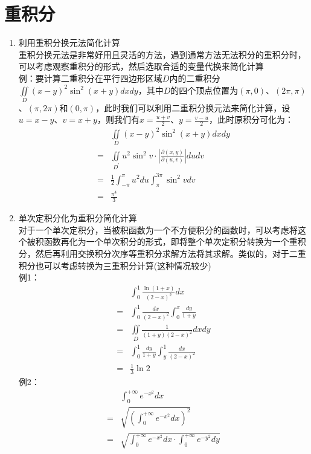 \documentclass[12pt,a4paper,UTF8]{book}
\begin{document}
\section{重积分}
\begin{enumerate}
\item 利用重积分换元法简化计算\\
重积分换元法是非常好用且灵活的方法，遇到通常方法无法积分的重积分时，可以考虑观察重积分的形式，然后选取合适的变量代换来简化计算\\
例：要计算二重积分在平行四边形区域$D$内的二重积分$\iint\limits_{D}\left(x-y\right)^2\sin^2\left(x+y\right)dxdy$，其中$D$的四个顶点位置为$\left(\pi,0\right)$、$\left(2\pi,\pi\right)$、$\left(\pi,2\pi\right)$和$\left(0,\pi\right)$，此时我们可以利用二重积分换元法来简化计算，设$u=x-y$、$v=x+y$，则我们有$x=\frac{u+v}{2}$、$y=\frac{v-u}{2}$，此时原积分可化为：
\[\begin{aligned}
&\iint\limits_{D}\left(x-y\right)^2\sin^2\left(x+y\right)dxdy\\
=&\iint\limits_{D^{\prime}}u^2\sin^2v\cdot\left|\frac{\partial\left(x,y\right)}{\partial\left(u,v\right)}\right|dudv\\
=&\frac{1}{2}\int_{-\pi}^{\pi}u^2du\int_{\pi}^{3\pi}\sin^2vdv\\
=&\frac{\pi^4}{3}
\end{aligned}\]
\item 单次定积分化为重积分简化计算\\
对于一个单次定积分，当被积函数为一个不方便积分的函数时，可以考虑将这个被积函数再化为一个单次积分的形式，即将整个单次定积分转换为一个重积分，然后再利用交换积分次序等重积分求解方法将其求解。类似的，对于二重积分也可以考虑转换为三重积分计算(这种情况较少)\\
例1：
\[\begin{aligned}
&\int_{0}^{1}\frac{\ln\left(1+x\right)}{\left(2-x\right)^2}dx\\
=&\int_{0}^{1}\frac{dx}{\left(2-x\right)^2}\int_{0}^{x}\frac{dy}{1+y}\\
=&\iint\limits_{D}\frac{1}{\left(1+y\right)\left(2-x\right)^2}dxdy\\
=&\int_{0}^{1}\frac{dy}{1+y}\int_{y}^{1}\frac{dx}{\left(2-x\right)^2}\\
=&\frac{1}{3}\ln2
\end{aligned}\]
例2：
\[\begin{aligned}
&\int_{0}^{+\infty}e^{-x^2}dx\\
=&\sqrt{\left(\int_{0}^{+\infty}e^{-x^2}dx\right)^2}\\
=&\sqrt{\int_{0}^{+\infty}e^{-x^2}dx\cdot\int_{0}^{+\infty}e^{-y^2}dy}\\

\end{aligned}\]
\end{enumerate}
\end{document}

